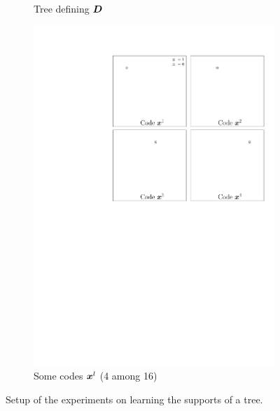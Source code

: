 \begin{figure}[!ht]
\begin{subfigure}[b]{0.325\textwidth}
	\caption{Tree defining $\bm{D}$}\label{fig_learntree_setup-tree}
\end{subfigure}
\begin{subfigure}[b]{0.325\textwidth}\centering
\includegraphics[width=\textwidth]{figures/tree-learn-setup/codes.pdf} 
	\caption{Some codes $\bm{x}^l$ (4 among 16)}\label{fig_learntree_setup-codes}
\end{subfigure}
\caption{Setup of the experiments on learning the supports of a tree.}\label{fig_learntree_setup}
\end{figure}


